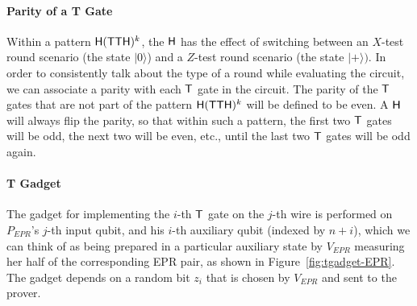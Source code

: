 \documentclass[11pt,letter]{article}
\theoremstyle{remark}
\theoremstyle{definition}
\newcommand{\ket}[1]{|#1\rangle}
\begin{document}
\paragraph{Parity of a T Gate} Within a pattern ${\sf H}({\sf TTH})^k$, the $\sf H$ has the effect of switching between an $X$-test round scenario (the state $\ket{0}$) and a $Z$-test round scenario (the state $\ket{+})$. In order to consistently talk about the type of a round while evaluating the circuit, we can associate a parity with each $\sf T$ gate in the circuit. The parity of the $\sf T$ gates that are not part of the pattern ${\sf H}({\sf TTH})^k$ will be defined to be even. A ${\sf H}$ will always flip the parity, so that within such a pattern, the first two ${\sf T}$ gates will be odd, the next two will be even, etc., until the last two $\sf T$ gates will be odd again. 

\paragraph{T Gadget} The gadget for implementing the $i$-th $\sf T$ gate on the $j$-th wire is performed on $P_{EPR}$'s $j$-th input qubit, and his $i$-th auxiliary qubit (indexed by $n+i$), which we can think of as being prepared in a particular auxiliary state by $V_{EPR}$ measuring her half of the corresponding EPR pair, as shown in Figure~\ref{fig:tgadget-EPR}. The gadget depends on a random bit $z_i$ that is chosen by $V_{EPR}$ and sent to the prover. 



\end{document}
